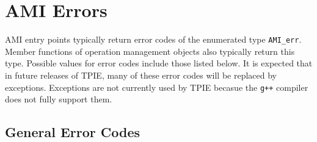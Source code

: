 \section{AMI Errors}
\label{sec:ami-errors}

AMI entry points typically return error codes of the enumerated type
\verb|AMI_err|.  Member functions of operation management
objects also typically return this
type.  Possible values for error codes include those listed below.  It
is expected that in future releases of TPIE, many of these error codes
will be replaced by exceptions.  Exceptions are not currently used by
TPIE becasue the {\tt g++} compiler does not fully support them.

\subsection{General Error Codes}

